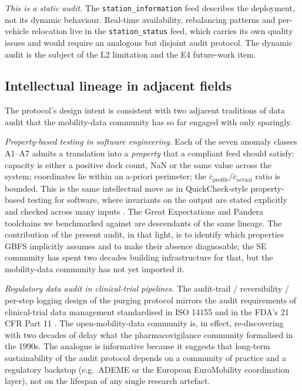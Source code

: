 \documentclass[11pt,a4paper]{article}
\begin{document}
\emph{This is a static audit. } The
\texttt{station\_information} feed describes the deployment, not
its dynamic behaviour. Real-time availability, rebalancing
patterns and per-vehicle relocation live in the
\texttt{station\_status} feed, which carries its own quality
issues and would require an analogous but disjoint audit
protocol. The dynamic audit is the subject of the L2 limitation
and the E4 future-work item.

\subsection{Intellectual lineage in adjacent fields}
The protocol's design intent is consistent with two adjacent
traditions of data audit that the mobility-data community has so
far engaged with only sparingly.

\emph{Property-based testing in software engineering.} Each of the
seven anomaly classes A1--A7 admits a translation into a
\emph{property} that a compliant feed should satisfy: capacity is
either a positive dock count, NaN or the same value across the
system; coordinates lie within an a-priori perimeter; the
$\bar c_{\text{profile}}/\bar c_{\text{actual}}$ ratio is bounded.
This is the same intellectual move as in QuickCheck-style
property-based testing for software, where invariants on the
output are stated explicitly and checked across many inputs
\cite{Hughes2007QuickCheck}. The Great Expectations and Pandera
toolchains \cite{GreatExpectations2024,Pandera2024} we benchmarked
against are descendants of the same lineage. The contribution of
the present audit, in that light, is to identify which properties
GBFS implicitly assumes and to make their absence diagnosable;
the SE community has spent two decades building infrastructure
for that, but the mobility-data community has not yet imported
it.

\emph{Regulatory data audit in clinical-trial pipelines.}
The audit-trail / reversibility / per-step logging design of the
purging protocol mirrors the audit requirements of clinical-trial
data management standardised in ISO 14155 \cite{ISO14155} and in
the FDA's 21 CFR Part 11 \cite{FDA21CFR11}. The open-mobility-data community is, in effect,
re-discovering with two decades of delay what the
pharmacovigilance community formalised in the 1990s. The
analogue is informative because it suggests that long-term
sustainability of the audit protocol depends on a community of
practice and a regulatory backstop (e.g.\ ADEME or the European
EuroMobility coordination layer), not on the lifespan of any
single research artefact.
\end{document}
